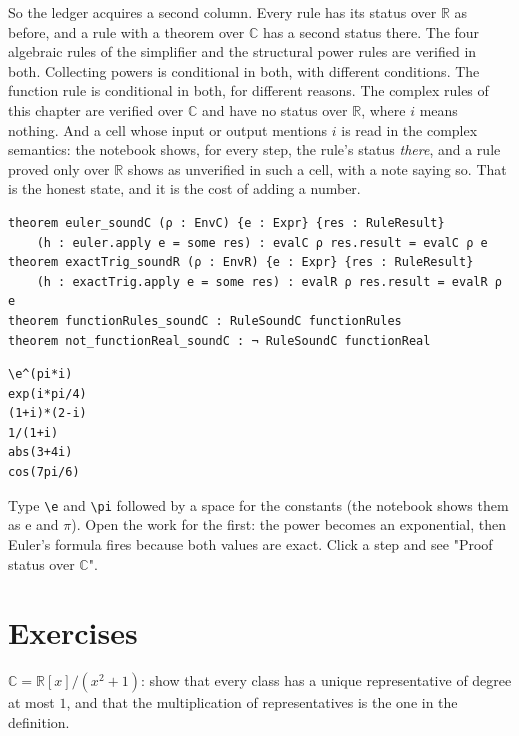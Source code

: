 So the ledger acquires a second column. Every rule has its status over $\mathbb{R}$ as before, and
a rule with a theorem over $\mathbb{C}$ has a second status there. The four algebraic rules of the
simplifier and the structural power rules are verified in both. Collecting powers is conditional
in both, with different conditions. The function rule is conditional in both, for different
reasons. The complex rules of this chapter are verified over $\mathbb{C}$ and have no status over
$\mathbb{R}$, where $i$ means nothing. And a cell whose input or output mentions $i$ is read in
the complex semantics: the notebook shows, for every step, the rule's status \emph{there}, and a
rule proved only over $\mathbb{R}$ shows as unverified in such a cell, with a note saying so.
That is the honest state, and it is the cost of adding a number.

\begin{verbatim}
theorem euler_soundC (ρ : EnvC) {e : Expr} {res : RuleResult}
    (h : euler.apply e = some res) : evalC ρ res.result = evalC ρ e
theorem exactTrig_soundR (ρ : EnvR) {e : Expr} {res : RuleResult}
    (h : exactTrig.apply e = some res) : evalR ρ res.result = evalR ρ e
theorem functionRules_soundC : RuleSoundC functionRules
theorem not_functionReal_soundC : ¬ RuleSoundC functionReal
\end{verbatim}

\begin{trybox}
\begin{verbatim}
\e^(pi*i)
exp(i*pi/4)
(1+i)*(2-i)
1/(1+i)
abs(3+4i)
cos(7pi/6)
\end{verbatim}
  Type \texttt{\textbackslash e} and \texttt{\textbackslash pi} followed by a space for the constants (the notebook shows them as $\mathrm{e}$ and $\pi$). Open the work
  for the first: the power becomes an exponential, then Euler's formula fires because both values
  are exact. Click a step and see "Proof status over $\mathbb{C}$".
\end{trybox}

\section{Exercises}

\begin{exercisebox}
  $\mathbb{C} = \mathbb{R}[x]/(x^2+1)$: show that every class has a unique representative of
  degree at most $1$, and that the multiplication of representatives is the one in the definition.
\end{exercisebox}

